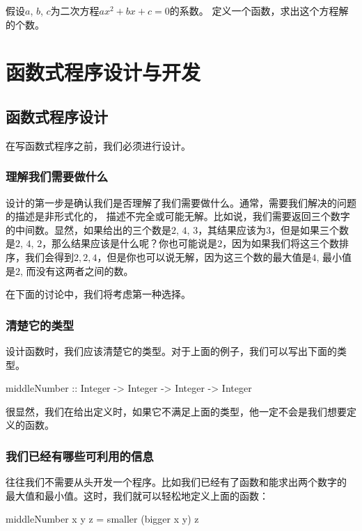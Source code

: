 \begin{exercise}
 假设$a$, $b$, $c$为二次方程$a x^2 + bx + c = 0$的系数。
 定义一个函数，求出这个方程解的个数。
\end{exercise}

\chapter{函数式程序设计与开发}

\section{函数式程序设计}

在写函数式程序之前，我们必须进行设计。

\subsection*{理解我们需要做什么}

设计的第一步是确认我们是否理解了我们需要做什么。通常，需要我们解决的问题的描述是非形式化的，
描述不完全或可能无解。比如说，我们需要返回三个数字的中间数。显然，如果给出的三个数是$2$, $4$, $3$，其结果应该为$3$，但是如果三个数是$2$, $4$, $2$，那么结果应该是什么呢？你也可能说是$2$，因为如果我们将这三个数排序，我们会得到$2, 2, 4$，但是你也可以说无解，因为这三个数的最大值是$4$, 最小值是$2$, 而没有这两者之间的数。

在下面的讨论中，我们将考虑第一种选择。

\subsection*{清楚它的类型}

设计函数时，我们应该清楚它的类型。对于上面的例子，我们可以写出下面的类型。
\begin{code}
middleNumber :: Integer -> Integer -> Integer -> Integer
\end{code}
很显然，我们在给出定义时，如果它不满足上面的类型，他一定不会是我们想要定义的函数。

\subsection*{我们已经有哪些可利用的信息}

往往我们不需要从头开发一个程序。比如我们已经有了函数和能求出两个数字的
最大值和最小值。这时，我们就可以轻松地定义上面的函数：
\begin{code}
middleNumber x y z = smaller (bigger x y) z
\end{code}

